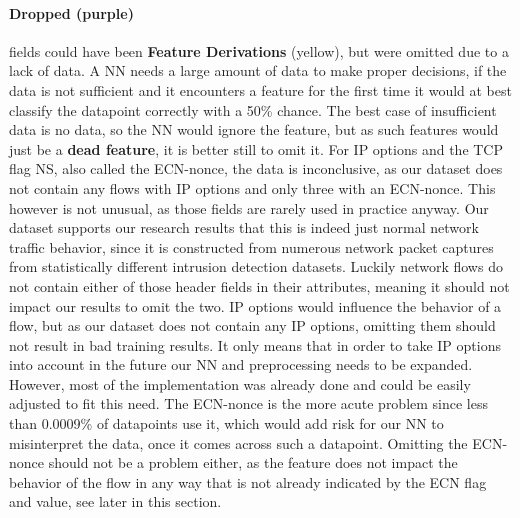 \documentclass[
	ngerman,
	ruledheaders=section,%
	class=report,%
	thesis={type=bachelor},%
	accentcolor=9c,%
	custommargins=true,%
	marginpar=false,%
	parskip=half-,%
	fontsize=11pt,%
]{tudapub}
\begin{document}
\paragraph{\colorbox{dropped}{\textbf{Dropped} (purple)}} fields could have been \colorbox{derivation}{\textbf{Feature Derivations} (yellow)}, but were omitted due to a lack of data.
A NN needs a large amount of data to make proper decisions, if the data is not sufficient and it encounters a feature for the first time it would at best classify the datapoint correctly with a 50\% chance.
The best case of insufficient data is no data, so the NN would ignore the feature, but as such features would just be a \textbf{dead feature}, it is better still to omit it.
For IP options and the TCP flag NS, also called the ECN-nonce, the data is inconclusive,
as our dataset does not contain any flows with IP options and only three with an ECN-nonce.
This however is not unusual, as those fields are rarely used in practice anyway.
Our dataset supports our research results that this is indeed just normal network traffic behavior,
since it is constructed from numerous network packet captures from statistically different intrusion detection datasets.
Luckily network flows do not contain either of those header fields in their attributes, meaning it should not impact our results to omit the two.
IP options would influence the behavior of a flow, but as our dataset does not contain any IP options, omitting them should not result in bad training results.
It only means that in order to take IP options into account in the future our NN and preprocessing needs to be expanded.
However, most of the implementation was already done and could be easily adjusted to fit this need.
The ECN-nonce is the more acute problem since less than 0.0009\% of datapoints use it,
which would add risk for our NN to misinterpret the data, once it comes across such a datapoint.
Omitting the ECN-nonce should not be a problem either, as the feature does not impact the behavior of the flow in any way that is not already indicated by the ECN flag and value, see later in this section.
\end{document}
